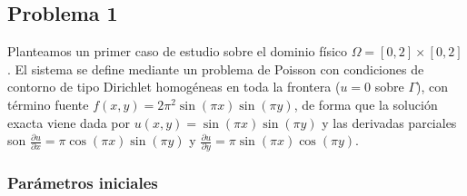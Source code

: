 \documentclass[11pt]{book}
\theoremstyle{plain} %
\theoremstyle{definition} %
\theoremstyle{definition} %
\begin{document}
\subsection{Problema 1}
Planteamos un primer caso de estudio sobre el dominio físico $\Omega = [0,2] \times [0,2]$.
El sistema se define mediante un problema de Poisson con condiciones de contorno de tipo Dirichlet
homogéneas en toda la frontera ($u=0$ sobre $\Gamma$), con término fuente $f(x,y) = 2\pi^2\sin(\pi x)\sin(\pi y)$,
de forma que la solución exacta viene dada por $u(x,y) = \sin(\pi x)\sin(\pi y)$ y las derivadas parciales son
$\frac{\partial u}{\partial x} = \pi \cos(\pi x)\sin(\pi y)$ y $\frac{\partial u}{\partial y} = \pi \sin(\pi x)\cos(\pi y)$.

    \vspace{-0.2cm}

\subsubsection{Parámetros iniciales}
    \vspace{-0.2cm}
\end{document}
